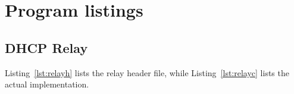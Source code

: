 \section{Program listings}
\subsection{DHCP Relay}
Listing~\ref{lst:relayh} lists the relay header file, while Listing~\ref{lst:relayc} lists the actual implementation.

